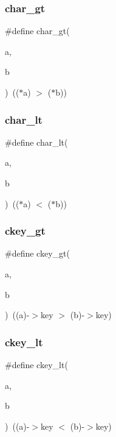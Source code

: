 \subsubsection{\texorpdfstring{char\+\_\+gt}{char\_gt}}
{\footnotesize\ttfamily \#define char\+\_\+gt(\begin{DoxyParamCaption}\item[{}]{a,  }\item[{}]{b }\end{DoxyParamCaption})~(($\ast$a) $>$ ($\ast$b))}

\mbox{\label{a00140_a9621b2096deac2e94ab89d73fa3904ce}} 
\subsubsection{\texorpdfstring{char\+\_\+lt}{char\_lt}}
{\footnotesize\ttfamily \#define char\+\_\+lt(\begin{DoxyParamCaption}\item[{}]{a,  }\item[{}]{b }\end{DoxyParamCaption})~(($\ast$a) $<$ ($\ast$b))}

\mbox{\label{a00140_a75ba6da738276df4e901fd2db157b1b2}} 
\subsubsection{\texorpdfstring{ckey\+\_\+gt}{ckey\_gt}}
{\footnotesize\ttfamily \#define ckey\+\_\+gt(\begin{DoxyParamCaption}\item[{}]{a,  }\item[{}]{b }\end{DoxyParamCaption})~((a)-\/$>$key $>$ (b)-\/$>$key)}

\mbox{\label{a00140_a649b7b4a837507141d9fa38277fa6cb3}} 
\subsubsection{\texorpdfstring{ckey\+\_\+lt}{ckey\_lt}}
{\footnotesize\ttfamily \#define ckey\+\_\+lt(\begin{DoxyParamCaption}\item[{}]{a,  }\item[{}]{b }\end{DoxyParamCaption})~((a)-\/$>$key $<$ (b)-\/$>$key)}

